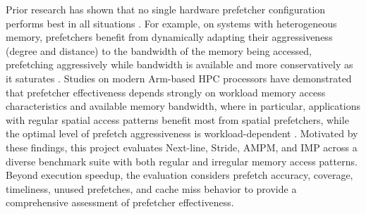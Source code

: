 \documentclass[12pt, letterpaper]{article}
\begin{document}
\noindent Prior research has shown that no single hardware prefetcher configuration performs best in all situations \cite{mittal-survey-16}. For example, on systems with heterogeneous memory, prefetchers benefit from dynamically adapting their aggressiveness (degree and distance) to the bandwidth of the memory being accessed, prefetching aggressively while bandwidth is available and more conservatively as it saturates \cite{fzj-hybrid-pf}. Studies on modern Arm-based HPC processors have demonstrated that prefetcher effectiveness depends strongly on workload memory access characteristics and available memory bandwidth, where in particular, applications with regular spatial access patterns benefit most from spatial prefetchers, while the optimal level of prefetch aggressiveness is workload-dependent \cite{arm-hpc-pf-25}. Motivated by these findings, this project evaluates Next-line, Stride, AMPM, and IMP across a diverse benchmark suite with both regular and irregular memory access patterns. Beyond execution speedup, the evaluation considers prefetch accuracy, coverage, timeliness, unused prefetches, and cache miss behavior to provide a comprehensive assessment of prefetcher effectiveness.
\end{document}
